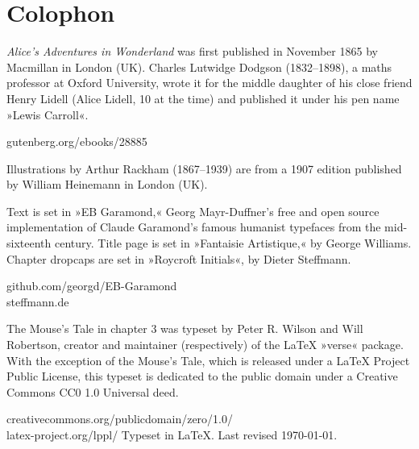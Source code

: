 \documentclass[
a5paper,
]{scrbook}
\begin{document}
\chapter*{Colophon}

\centering

\vfill
\begin{minipage}{\textwidth}
\textit{Alice's Adventures in Wonderland} was first published in November 1865 by Macmillan in London (UK). Charles Lutwidge Dodgson (1832--1898), a maths professor at Oxford University, wrote it for the middle daughter of his close friend Henry Lidell (Alice Lidell, 10 at the time) and published it under his pen name »Lewis Carroll«.
\end{minipage}
\vfill
gutenberg.org/ebooks/28885
\vfill
\divider
\vfill
\begin{minipage}{\textwidth}
Illustrations by Arthur Rackham (1867--1939) are from a 1907 edition published by William Heinemann in London (UK).
\end{minipage}
\vfill
\divider
\vfill
\begin{minipage}{\textwidth}
Text is set in »EB Garamond,« Georg Mayr-Duffner's free and open source implementation of Claude Garamond’s famous humanist typefaces from the mid-sixteenth century. Title page is set in »Fantaisie Artistique,« by George Williams. Chapter dropcaps are set in »Roycroft Initials«, by Dieter Steffmann.
\end{minipage}
\vfill
github.com/georgd/EB-Garamond\\steffmann.de
\vfill
\divider
\vfill
\begin{minipage}{\textwidth}
The Mouse's Tale in chapter 3 was typeset by Peter R. Wilson and Will Robertson, creator and maintainer (respectively) of the \LaTeX{} »verse« package. With the exception of the Mouse's Tale, which is released under a \LaTeX{} Project Public License, this typeset is dedicated to the public domain under a Creative Commons CC0 1.0 Universal deed. 
\end{minipage}
\vfill
creativecommons.org/publicdomain/zero/1.0/\\latex-project.org/lppl/
\vfill
\divider
\vfill
Typeset in \LaTeX{}. Last revised \today.
\thispagestyle{empty}
\end{document}
